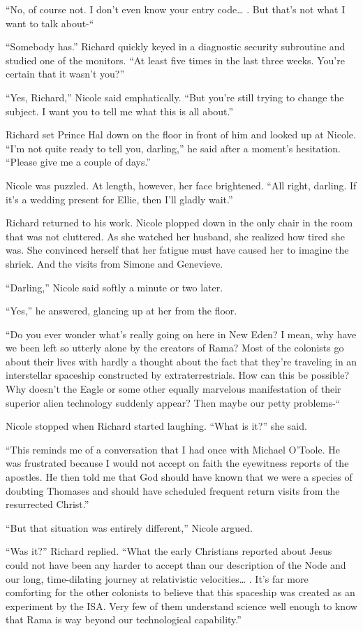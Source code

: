 \documentclass[]{article}
\begin{document}
{“No, of course not. I don’t even know your entry code… . But that’s not what I want to talk about-“

“Somebody has.” Richard quickly keyed in a diagnostic security subroutine and studied one of the monitors. “At least five times in the last three weeks. You’re certain that it wasn’t you?”

“Yes, Richard,” Nicole said emphatically. “But you’re still trying to change the subject. I want you to tell me what this is all about.”

Richard set Prince Hal down on the floor in front of him and looked up at Nicole. “I’m not quite ready to tell you, darling,” he said after a moment’s hesitation. “Please give me a couple of days.”

Nicole was puzzled. At length, however, her face brightened. “All right, darling. If it’s a wedding present for Ellie, then I’ll gladly wait.”

Richard returned to his work. Nicole plopped down in the only chair in the room that was not cluttered. As she watched her husband, she realized how tired she was. She convinced herself that her fatigue must have caused her to imagine the shriek. And the visits from Simone and Genevieve.

“Darling,” Nicole said softly a minute or two later.

“Yes,” he answered, glancing up at her from the floor.

“Do you ever wonder what’s really going on here in New Eden? I mean, why have we been left so utterly alone by the creators of Rama? Most of the colonists go about their lives with hardly a thought about the fact that they’re traveling in an interstellar spaceship constructed by extraterrestrials. How can this be possible? Why doesn’t the Eagle or some other equally marvelous manifestation of their superior alien technology suddenly appear? Then maybe our petty problems-“

Nicole stopped when Richard started laughing. “What is it?” she said.

“This reminds me of a conversation that I had once with Michael O’Toole. He was frustrated because I would not accept on faith the eyewitness reports of the apostles. He then told me that God should have known that we were a species of doubting Thomases and should have scheduled frequent return visits from the resurrected Christ.”

“But that situation was entirely different,” Nicole argued.

“Was it?” Richard replied. “What the early Christians reported about Jesus could not have been any harder to accept than our description of the Node and our long, time-dilating journey at relativistic velocities… . It’s far more comforting for the other colonists to believe that this spaceship was created as an experiment by the ISA. Very few of them understand science well enough to know that Rama is way beyond our technological capability.”

}
\end{document}
